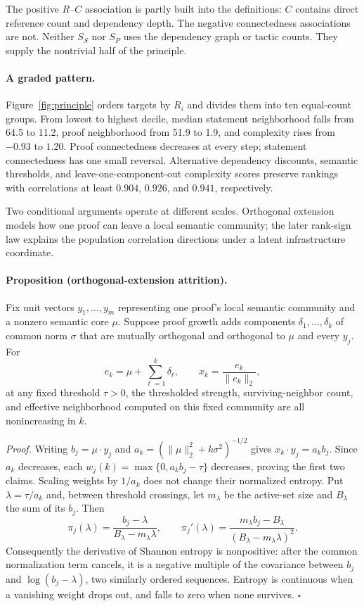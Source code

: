 \documentclass[11pt]{article}
\begin{document}
The positive $R$--$C$ association is partly built into the definitions: $C$ contains direct
reference count and dependency depth.  The negative connectedness associations are not.  Neither
$S_S$ nor $S_P$ uses the dependency graph or tactic counts.  They supply the nontrivial half of the
principle.

\paragraph{A graded pattern.}
Figure~\ref{fig:principle} orders targets by $R_i$ and divides them into ten equal-count groups.
From lowest to highest decile, median statement neighborhood falls from 64.5 to 11.2, proof
neighborhood from 51.9 to 1.9, and complexity rises from $-0.93$ to $1.20$.  Proof connectedness
decreases at every step; statement connectedness has one small reversal.  Alternative dependency
discounts, semantic thresholds, and leave-one-component-out complexity scores preserve rankings
with correlations at least $0.904$, $0.926$, and $0.941$, respectively.

Two conditional arguments operate at different scales.  Orthogonal extension models how one proof
can leave a local semantic community; the later rank-sign law explains the population correlation
directions under a latent infrastructure coordinate.

\paragraph{Proposition (orthogonal-extension attrition).}
Fix unit vectors $y_1,\ldots,y_m$ representing one proof's local semantic community and a
nonzero semantic core $\mu$.  Suppose proof growth adds components $\delta_1,\ldots,\delta_k$ of
common norm $\sigma$ that are mutually orthogonal and orthogonal to $\mu$ and every $y_j$.  For
\[
 e_k=\mu+\sum_{\ell=1}^k\delta_\ell,\qquad x_k=\frac{e_k}{\lVert e_k\rVert_2},
\]
at any fixed threshold $\tau>0$, the thresholded strength, surviving-neighbor count, and effective
neighborhood computed on this fixed community are all nonincreasing in $k$.

\emph{Proof.}
Writing $b_j=\mu\mathbin{\cdot}y_j$ and
$a_k=(\lVert \mu\rVert_2^2+k\sigma^2)^{-1/2}$ gives
$x_k\mathbin{\cdot}y_j=a_kb_j$.  Since $a_k$ decreases, each
$w_j(k)=\max\{0,a_kb_j-\tau\}$ decreases, proving the first two claims.  Scaling weights by
$1/a_k$ does not change their normalized entropy.  Put $\lambda=\tau/a_k$ and, between threshold
crossings, let $m_\lambda$ be the active-set size and $B_\lambda$ the sum of its $b_j$.  Then
\[
 \pi_j(\lambda)=\frac{b_j-\lambda}{B_\lambda-m_\lambda\lambda},\qquad
 \pi_j'(\lambda)=\frac{m_\lambda b_j-B_\lambda}
 {(B_\lambda-m_\lambda\lambda)^2}.
\]
Consequently the derivative of Shannon entropy is nonpositive: after the common normalization
term cancels, it is a negative multiple of the covariance between $b_j$ and
$\log(b_j-\lambda)$, two similarly ordered sequences.  Entropy is continuous when a vanishing weight
drops out, and falls to zero when none survives. $\square$
\end{document}
